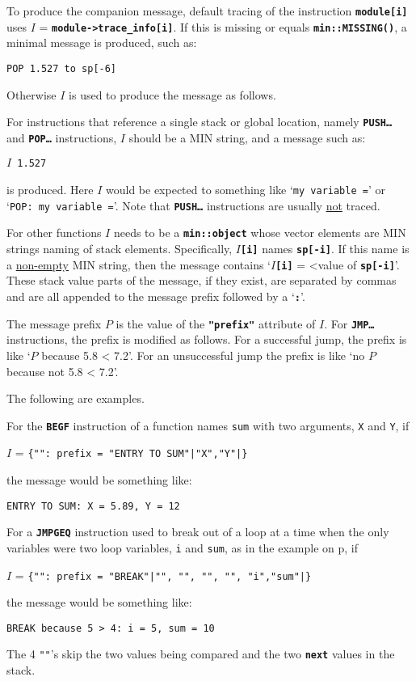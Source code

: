 \documentclass[12pt]{article}
\newcommand{\TT}[1]{{\tt \bfseries #1}}
\newcommand{\pagref}[1]{p\pageref{#1}}
\begin{document}
To produce the companion message,
default tracing of the instruction \TT{module[i]} uses
$I$ = \TT{module->trace\_info[i]}.  If this is missing
or equals \TT{min::MISSING()}, a minimal message
is produced, such as:
\begin{center}
\tt POP 1.527 to sp[-6]
\end{center}
Otherwise $I$ is used to produce the message as follows.

For instructions that reference a single stack or global location,
namely \TT{PUSH\ldots} and \TT{POP\ldots} instructions,
$I$ should be a MIN string, and a message such
as:
\begin{center}
\tt $I$ 1.527
\end{center}
is produced.  Here $I$ would be expected to something
like `{\tt my variable =}' or `{\tt POP: my variable =}'.
Note that \TT{PUSH\ldots} instructions are usually
\underline{not} traced.

For other functions $I$ needs to be a \TT{min::object}
whose vector elements are MIN strings naming of stack
elements.  Specifically, $I$\TT{[i]} names \TT{sp[-i]}.
If this name is a \underline{non-empty} MIN string,
then the message contains `$I$\TT{[i]} = <value of \TT{sp[-i]}'.
These stack value parts of the message, if they exist, are separated
by commas and are all appended to the message prefix followed by a `\TT{:}'.

The message prefix $P$ is the value of the \TT{"prefix"} attribute
of $I$.  For \TT{JMP\ldots} instructions, the prefix is modified as
follows.  For a successful jump, the prefix is like
`$P$ because 5.8 < 7.2'.  For an unsuccessful jump the prefix
is like `no $P$ because not 5.8 < 7.2'.

The following are examples.

For the \TT{BEGF} instruction of a function names {\tt sum} with
two arguments, {\tt X} and {\tt Y}, if
\begin{center}
$I$ = {\tt \{"": prefix = "ENTRY TO SUM"|"X","Y"|\}}
\end{center}
the message would be something like:
\begin{center}
\tt ENTRY TO SUM: X = 5.89, Y = 12
\end{center}

For a \TT{JMPGEQ} instruction used to break out of a loop
at a time when the only variables were two loop variables,
{\tt i} and {\tt sum}, as in the example on \pagref{EXAMPLE-LOOP}, if
\begin{center}
$I$ = {\tt \{"": prefix = "BREAK"|"", "", "", "", "i","sum"|\}}
\end{center}
the message would be something like:
\begin{center}
\tt BREAK because 5 > 4: i = 5, sum = 10
\end{center}
The 4 {\tt ""}'s skip the two values being compared and the two \TT{next}
values in the stack.
\end{document}
